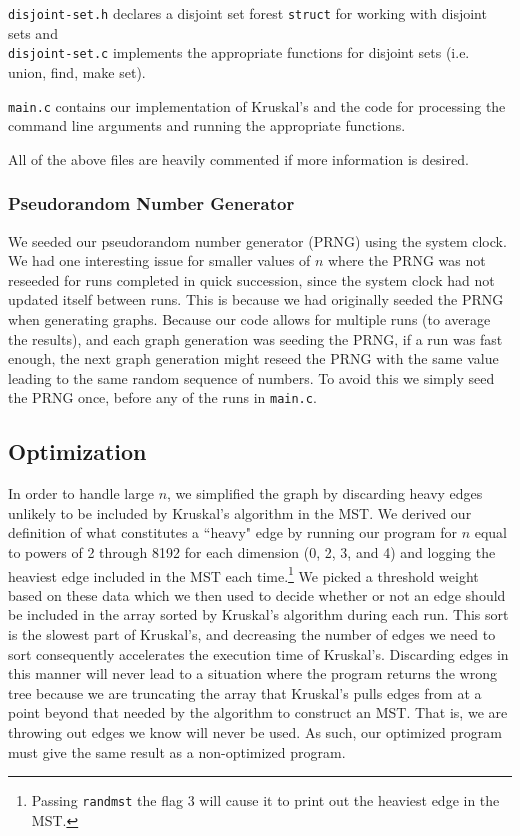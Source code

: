 \documentclass[solution, letterpaper]{cs121}
\begin{document}
\texttt{disjoint-set.h} declares a disjoint set forest \texttt{struct} for working with disjoint sets and\\ \texttt{disjoint-set.c} implements
the appropriate functions for disjoint sets (i.e. union, find, make set).

\texttt{main.c} contains our implementation of Kruskal's and the code for processing the command line arguments and running the appropriate functions.

All of the above files are heavily commented if more information is desired.

\subsubsection*{Pseudorandom Number Generator}
\hspace{5mm} We seeded our pseudorandom number generator (PRNG) using the system clock. We had one interesting issue for smaller values of $n$ where the PRNG was not reseeded for runs completed in quick succession, since the system clock had not updated itself between runs. This is because we had originally seeded the PRNG when generating graphs. Because our code allows for multiple runs (to average the results), and each graph generation was seeding the PRNG, if a run was fast enough, the next graph generation might reseed the PRNG with the same value leading to the same random sequence of numbers. To avoid this we simply seed the PRNG once, before any of the runs in \texttt{main.c}.

\subsection*{Optimization}
\hspace{5mm} In order to handle large $n$, we simplified the graph by discarding heavy edges unlikely to be included by Kruskal's algorithm in the MST. We derived our definition of what constitutes a 	``heavy" edge by running our program for $n$ equal to powers of 2 through 8192 for each dimension (0, 2, 3, and 4) and logging the heaviest edge included in the MST each time.\footnote{Passing {\tt randmst} the flag 3 will cause it to print out the heaviest edge in the MST.} We picked a threshold weight based on these data which we then used to decide whether or not an edge should be included in the array sorted by Kruskal's algorithm during each run. This sort is the slowest part of Kruskal's, and decreasing the number of edges we need to sort consequently accelerates the execution time of Kruskal's. Discarding edges in this manner will never lead to a situation where the program returns the wrong tree because we are truncating the array that Kruskal's pulls edges from at a point beyond that needed by the algorithm to construct an MST. That is, we are throwing out edges we know will never be used. As such, our optimized program must give the same result as a non-optimized program.
\end{document}
